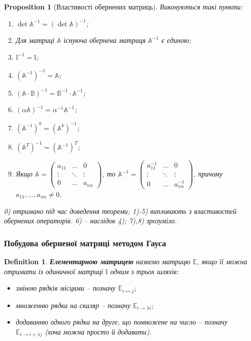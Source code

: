\documentclass[a4paper, 10pt]{article}
\theoremstyle{theoremdd}
\newtheorem{definition}[theorem]{Definition}
\newtheorem{proposition}[theorem]{Proposition}
\begin{document}
\begin{proposition}[Властивості обернених матриць]
	Виконуються такі пункти:
	\begin{enumerate}[nosep,wide=0pt,label={\arabic*)},start=0]
	\item $\det \mathbb{A}^{-1} = (\det \mathbb{A})^{-1}$;
	\item Для матриці $\mathbb{A}$ існуюча обернена матриця $\mathbb{A}^{-1}$ є єдиною;
	\item $\mathbb{I}^{-1} = \mathbb{I}$;
	\item $(\mathbb{A}^{-1})^{-1} = \mathbb{A}$;
	\item $(\mathbb{A} \cdot \mathbb{B})^{-1} = \mathbb{B}^{-1} \cdot \mathbb{A}^{-1}$;
	\item $(\alpha \mathbb{A})^{-1} = \alpha^{-1} \mathbb{A}^{-1}$;
	\item $(\mathbb{A}^{-1})^k = (\mathbb{A}^k)^{-1}$;
	\item $(\mathbb{A}^T)^{-1} = (\mathbb{A}^{-1})^T$;
	\item Якщо $\mathbb{A} = \begin{pmatrix}
	a_{11} & \dots & 0 \\
	\vdots & \ddots & \vdots \\
	0 & \dots & a_{nn}
	\end{pmatrix}$, то $\mathbb{A}^{-1} = \begin{pmatrix}
	a_{11}^{-1} & \dots & 0 \\
	\vdots & \ddots & \vdots \\
	0 & \dots & a_{nn}^{-1}
	\end{pmatrix}$, причому $a_{11},\dots,a_{nn} \neq 0$.
	\end{enumerate}
\textit{0) отримано під час доведення теореми; 1)-5) випливають з властивостей обернених операторів. 6) -- наслідок 4); 7),8) зрозуміло.}
\end{proposition}

\subsubsection*{Побудова оберненої матриці методом Гауса}
\begin{definition}
\textbf{Елементарною матрицею} назвемо матрицю $\mathbb{E}$, якщо її можна отримати із одиничної матриці $\mathbb{I}$ одним з трьох шляхів:
\begin{itemize}[label={-}, nosep, wide=0pt]
\item зміною рядків місцями -- позначу $\mathbb{E}_{i \leftrightarrow j}$;
\item множенню рядка на скаляр -- позначу $\mathbb{E}_{i \rightarrow \lambda i}$;
\item додаванню одного рядка на друге, що помножене на число -- позначу $\mathbb{E}_{i \rightarrow i + \lambda j}$ (хоча можна просто й додавати).
\end{itemize}
\end{definition}
\end{document}
